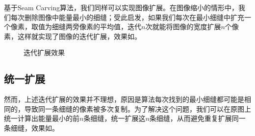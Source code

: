 \documentclass[11pt,a4paper]{article}
\begin{document}
基于Seam Carving算法，我们同样可以实现图像扩展。在图像缩小的情形中，我们每次删除图像中能量最小的细缝；受此启发，如果我们每次在最小细缝中扩充一个像素，取值为细缝两旁像素的平均值，迭代$n$次就能将图像的宽度扩展$n$个像素，这样就实现了图像的迭代扩展，效果如。

\begin{figure}[H]
    \centering
    \caption{迭代扩展效果}
    \label{fig:iter_expand}
\end{figure}

\subsection{统一扩展}

然而，上述迭代扩展的效果并不理想，原因是算法每次找到的最小细缝都可能是相同的，导致同一条细缝的像素被多次复制。为了解决这个问题，我们可以在原图上统一计算出能量最小的前$n$条细缝，统一扩展这$n$条细缝，从而避免重复扩展同一条细缝，效果如。
\end{document}

